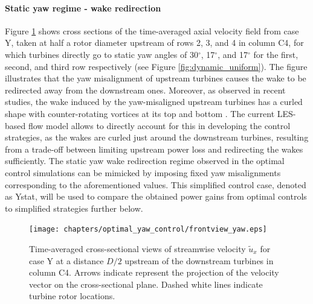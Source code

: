 	\paragraph{Static yaw regime - wake redirection}
	Figure \ref{fig:cross_section} shows cross sections of the time-averaged axial velocity field from case Y, taken at half a rotor diameter upstream of rows 2, 3, and 4 in column C4, for which turbines directly go to static yaw angles of 30$^\circ$, 17$^\circ$, and 17$^\circ$ for the first, second, and third row respectively (see Figure \ref{fig:dynamic_uniform}). The figure illustrates that the yaw misalignment of upstream turbines causes the wake to be redirected away from the downstream ones. Moreover, as observed in recent studies, the wake induced by the yaw-misaligned upstream turbines has a curled shape with counter-rotating vortices at its top and bottom \citep{howland2016wake,bastankhah2016experimental}. The current LES-based flow model allows to directly account for this in developing the control strategies, as the wakes are curled just around the downstream turbines, resulting from a trade-off between limiting upstream power loss and redirecting the wakes sufficiently. The static yaw wake redirection regime observed in the optimal control simulations can be mimicked by imposing fixed yaw misalignments corresponding to the aforementioned values. This simplified control case, denoted as Ystat, will be used to compare the obtained power gains from optimal controls to simplified strategies further below. 
	\begin{figure}
		\texttt{[image: chapters/optimal\_yaw\_control/frontview\_yaw.eps]}
		\caption{Time-averaged cross-sectional views of streamwise velocity $\widetilde{u}_x$ for case Y at a distance $D/2$ upstream of the downstream turbines in column C4. Arrows indicate represent the projection of the velocity vector on the cross-sectional plane. Dashed white lines indicate turbine rotor locations. \label{fig:cross_section}}
	\end{figure}
	
